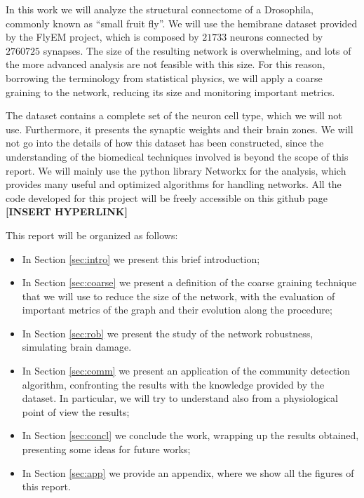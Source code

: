In this work we will analyze the structural connectome of a Drosophila, commonly known as 
“small fruit fly”. We will use the hemibrane dataset provided by the FlyEM project\cite{xu2020connectome}, which is composed by $21733$ neurons connected by $2760725$ synapses. The size
of the resulting network is overwhelming, and lots of the more advanced analysis are 
not feasible with this size. For this reason, borrowing the terminology from statistical
physics, we will apply a coarse graining to the network, reducing its size and monitoring
important metrics. 

The dataset contains a complete set of the neuron cell type, which we will
not use. Furthermore, it presents the synaptic weights and their brain zones. 
We will not go into the details of how this dataset has been constructed, since the understanding
of the biomedical techniques involved is beyond the scope of this report.
We will mainly use the python library Networkx\cite{hagberg2008exploring} for the analysis, 
which provides many useful and optimized algorithms for handling networks. All the code developed
for this project will be freely accessible on this github page \textbf{[INSERT HYPERLINK]}


This report will be organized as follows:
\begin{itemize}
    \item In Section \ref{sec:intro} we present this brief introduction;
    \item In Section \ref{sec:coarse} we present a definition of the coarse graining technique that we will use to reduce the size 
        of the network, with the evaluation of important metrics of the graph and their 
        evolution along the procedure;
    \item In Section \ref{sec:rob} we present the study of the network robustness, simulating brain damage. 
    \item In Section \ref{sec:comm} we present an application of the community detection algorithm, confronting the results
        with the knowledge provided by the dataset. In particular, we will try to understand
        also from a physiological point of view the results;
    \item In Section \ref{sec:concl} we conclude the work, wrapping up the results obtained, presenting some 
        ideas for future works;
    \item In Section \ref{sec:app} we provide an appendix, where we show all the figures
     of this report.
\end{itemize}
